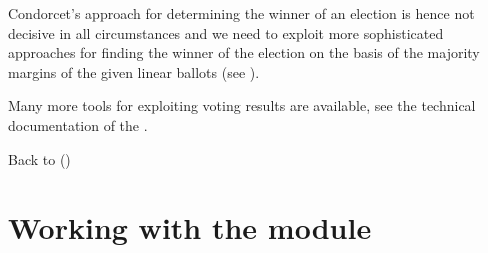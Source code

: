 \documentclass[a4paper,10pt,english]{sphinxhowto}
\begin{document}
Condorcet’s approach for determining the winner of an election is hence not decisive in all circumstances and we need to exploit more sophisticated approaches for finding the winner of the election on the basis of the majority margins of the given linear ballots (see ).

Many more tools for exploiting voting results are available, see the technical documentation of the .

Back to {\hyperref[\detokenize{tutorial:tutorial-label}]{}} ()


\section{Working with the  module}
\label{\detokenize{tutorial:working-with-the-outrankingdigraphs-module}}\label{\detokenize{tutorial:outrankingdigraphs-tutorial-label}}
\end{document}

